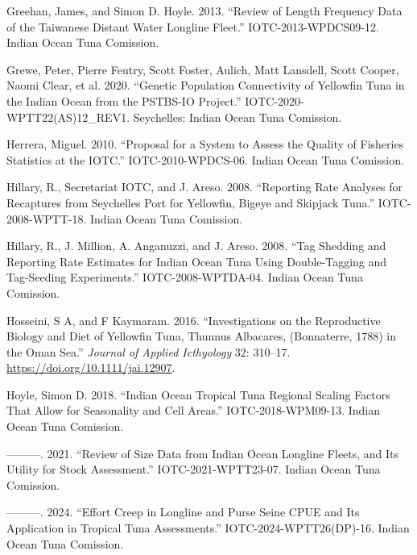 \documentclass[
]{scrartcl}
\newlength{\cslhangindent}
\newenvironment{CSLReferences}[2] %
 {\begin{list}{}{%
  \setlength{\itemindent}{0pt}
  \setlength{\leftmargin}{0pt}
  \setlength{\parsep}{0pt}
  \ifodd #1
   \setlength{\leftmargin}{\cslhangindent}
   \setlength{\itemindent}{-1\cslhangindent}
  \fi
  \setlength{\itemsep}{#2\baselineskip}}}
 {\end{list}}
\begin{document}
\begin{CSLReferences}{1}{0}
Greehan, James, and Simon D. Hoyle. 2013. {``Review of Length Frequency
Data of the {Taiwanese Distant Water Longline Fleet}.''}
IOTC-2013-WPDCS09-12. Indian Ocean Tuna Comission.

Grewe, Peter, Pierre Feutry, Scott Foster, Aulich, Matt Lansdell, Scott
Cooper, Naomi Clear, et al. 2020. {``Genetic Population Connectivity of
Yellowfin Tuna in the {Indian Ocean} from the {PSTBS-IO Project}.''}
IOTC-2020-WPTT22(AS)12\_REV1. Seychelles: Indian Ocean Tuna Comission.

Herrera, Miguel. 2010. {``Proposal for a System to Assess the Quality of
Fisheries Statistics at the {IOTC}.''} IOTC-2010-WPDCS-06. Indian Ocean
Tuna Comission.

Hillary, R., Secretariat IOTC, and J. Areso. 2008. {``Reporting Rate
Analyses for Recaptures from {Seychelles} Port for Yellowfin, Bigeye and
Skipjack Tuna.''} IOTC-2008-WPTT-18. Indian Ocean Tuna Comission.

Hillary, R., J. Million, A. Anganuzzi, and J. Areso. 2008. {``Tag
Shedding and Reporting Rate Estimates for {Indian Ocean} Tuna Using
Double-Tagging and Tag-Seeding Experiments.''} IOTC-2008-WPTDA-04.
Indian Ocean Tuna Comission.

Hosseini, S A, and F Kaymaram. 2016. {``Investigations on the
Reproductive Biology and Diet of Yellowfin Tuna, {Thunnus} Albacares,
({Bonnaterre}, 1788) in the {Oman Sea}.''} \emph{Journal of Applied
Icthyology} 32: 310--17. \url{https://doi.org/10.1111/jai.12907}.

Hoyle, Simon D. 2018. {``Indian {Ocean} Tropical Tuna Regional Scaling
Factors That Allow for Seasonality and Cell Areas.''}
IOTC-2018-WPM09-13. Indian Ocean Tuna Comission.

---------. 2021. {``Review of Size Data from {Indian Ocean} Longline
Fleets, and Its Utility for Stock Assessment.''} IOTC-2021-WPTT23-07.
Indian Ocean Tuna Comission.

---------. 2024. {``Effort Creep in Longline and Purse Seine {CPUE} and
Its Application in Tropical Tuna Assessments.''}
IOTC-2024-WPTT26(DP)-16. Indian Ocean Tuna Comission.


\end{CSLReferences}
\end{document}
